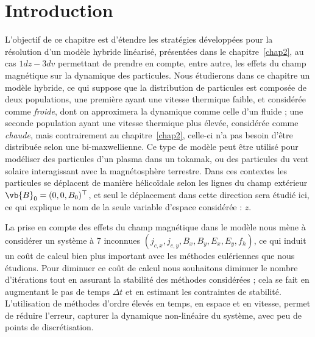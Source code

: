 
\section{Introduction}

L'objectif de ce chapitre est d'étendre les stratégies développées pour la résolution d'un modèle hybride linéarisé, présentées dans le chapitre~\ref{chap2}, au cas $1dz-3dv$ permettant de prendre en compte, entre autre, les effets du champ magnétique sur la dynamique des particules. Nous étudierons dans ce chapitre un modèle hybride, ce qui suppose que la distribution de particules est composée de deux populations, une première ayant une vitesse thermique faible, et considérée comme \emph{froide}, dont on approximera la dynamique comme celle d'un fluide ; une seconde population ayant une vitesse thermique plus élevée, considérée comme \emph{chaude}, mais contrairement au chapitre~\ref{chap2}, celle-ci n'a pas besoin d'être distribuée selon une bi-maxwellienne. Ce type de modèle peut être utilisé pour modéliser des particules d'un plasma dans un tokamak, ou des particules du vent solaire interagissant avec la magnétosphère terrestre. Dans ces contextes les particules se déplacent de manière hélicoïdale selon les lignes du champ extérieur $\vb{B}_0 = (0,0,B_0)^\top$, et seul le déplacement dans cette direction sera étudié ici, ce qui explique le nom de la seule variable d'espace considérée : $z$.

La prise en compte des effets du champ magnétique dans le modèle nous mène à considérer un système à 7 inconnues $(j_{c,x},j_{c,y},B_x,B_y,E_x,E_y,f_h)$, ce qui induit un coût de calcul bien plus important avec les méthodes eulériennes que nous étudions. Pour diminuer ce coût de calcul nous souhaitons diminuer le nombre d'itérations tout en assurant la stabilité des méthodes considérées ; cela se fait en augmentant le pas de temps $\Delta t$ et en estimant les contraintes de stabilité. L'utilisation de méthodes d'ordre élevés en temps, en espace et en vitesse, permet de réduire l'erreur, capturer la dynamique non-linéaire du système, avec peu de points de discrétisation.

